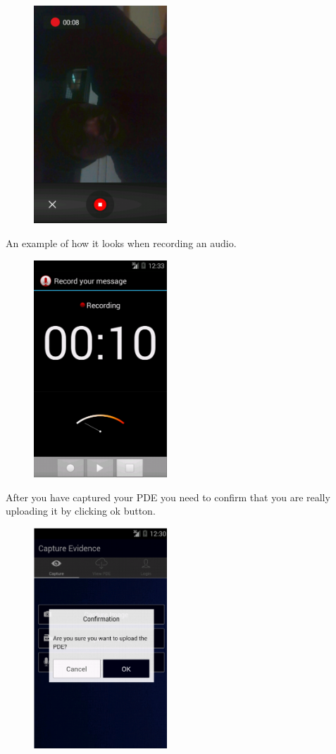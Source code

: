 \documentclass[a4paper,12pt]{article}
\begin{document}
\begin{figure}[H]
\begin{center}
\includegraphics[width=50mm,scale=0.5]{images/screenshots/capturevideo.png}
\end{center}
\end{figure}
An example of how it looks when recording an audio.
\begin{figure}[H]
\begin{center}
\includegraphics[width=50mm,scale=0.5]{images/screenshots/record.png}
\end{center}
\end{figure}
After you have captured your PDE you need to confirm that you are really uploading it by clicking ok button.
\begin{figure}[H]
\begin{center}
\includegraphics[width=50mm,scale=0.5]{images/screenshots/confirm.png}
\end{center}
\end{figure}
\end{document}
